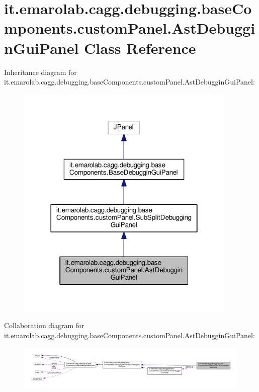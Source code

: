 \hypertarget{classit_1_1emarolab_1_1cagg_1_1debugging_1_1baseComponents_1_1customPanel_1_1AstDebugginGuiPanel}{\section{it.\-emarolab.\-cagg.\-debugging.\-base\-Components.\-custom\-Panel.\-Ast\-Debuggin\-Gui\-Panel Class Reference}
\label{classit_1_1emarolab_1_1cagg_1_1debugging_1_1baseComponents_1_1customPanel_1_1AstDebugginGuiPanel}
}


Inheritance diagram for it.\-emarolab.\-cagg.\-debugging.\-base\-Components.\-custom\-Panel.\-Ast\-Debuggin\-Gui\-Panel\-:\nopagebreak
\begin{figure}[H]
\begin{center}
\leavevmode
\includegraphics[width=298pt]{classit_1_1emarolab_1_1cagg_1_1debugging_1_1baseComponents_1_1customPanel_1_1AstDebugginGuiPanel__inherit__graph}
\end{center}
\end{figure}


Collaboration diagram for it.\-emarolab.\-cagg.\-debugging.\-base\-Components.\-custom\-Panel.\-Ast\-Debuggin\-Gui\-Panel\-:\nopagebreak
\begin{figure}[H]
\begin{center}
\leavevmode
\includegraphics[width=350pt]{classit_1_1emarolab_1_1cagg_1_1debugging_1_1baseComponents_1_1customPanel_1_1AstDebugginGuiPanel__coll__graph}
\end{center}
\end{figure}
